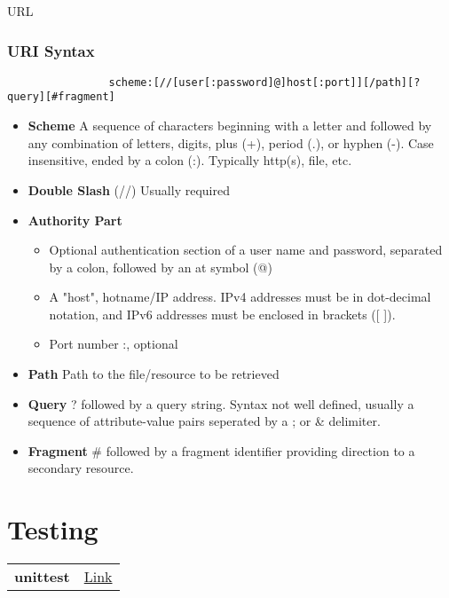 		\begin{questions}{URL}
			\begin{questionAnswer}
			\end{questionAnswer}

		\subsection{URI Syntax}
		\begin{center}
			\begin{verbatim}
				scheme:[//[user[:password]@]host[:port]][/path][?query][#fragment]
			\end{verbatim}
		\end{center}

		\begin{itemize}
			\item \textbf{Scheme} A sequence of characters beginning with a letter and followed by any combination of letters, digits, plus (+), period (.), or hyphen (-). Case insensitive, ended by a colon (:). Typically http(s), file, etc.
			\item \textbf{Double Slash} (//) Usually required
			\item \textbf{Authority Part}

				\begin{itemize}
					\item Optional authentication section of a user name and password, separated by a colon, followed by an at symbol (@)
					\item A "host", hotname/IP address. IPv4 addresses must be in dot-decimal notation, and IPv6 addresses must be enclosed in brackets ([ ]).
					\item Port number \ra {}:, optional
				\end{itemize}
			\item \textbf{Path} Path to the file/resource to be retrieved
			\item \textbf{Query} ? followed by a query string. Syntax not well defined, usually a sequence of attribute-value pairs seperated by a ; or \& delimiter.
			\item \textbf{Fragment} \# followed by a fragment identifier providing direction to a secondary resource.
		\end{itemize}
		\end{questions}

	\chapter{Testing}
		\begin{tabular}{ll}
			\textbf{unittest}&\href{https://docs.python.org/3.5/library/unittest.html}{Link}\\
		\end{tabular}
